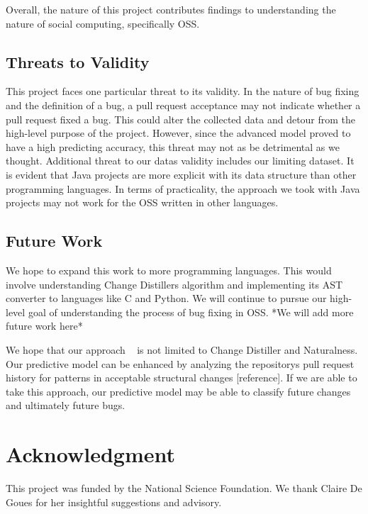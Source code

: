 \documentclass[10pt, conference]{IEEEtran}
\begin{document}
Overall, the nature of this project contributes findings to understanding the nature of social computing, specifically OSS. 

\subsection{Threats to Validity}
This project faces one particular threat to its validity. In the nature of bug fixing and the definition of a bug, a pull request acceptance may not indicate whether a pull request fixed a bug. This could alter the collected data and detour from the high-level purpose of the project. However, since the advanced model proved to have a high predicting accuracy, this threat may not as be detrimental as we thought. Additional threat to  our data\textquotesingle s validity includes our limiting dataset. It is evident that Java projects are more explicit with its data structure than other programming languages. In terms of practicality, the approach we took with Java projects may not work for the OSS written in other languages.

\subsection{Future Work}
We hope to expand this work to more programming languages. This would involve understanding Change Distiller\textquotesingle s algorithm and implementing its AST converter to languages like C and Python. We will continue to pursue our high-level goal of understanding the process of bug fixing in OSS. *We will add more future work here*

We hope that our approach ~\cite{Giachino:2014:CRD:2731750.2731754} is not limited to Change Distiller and Naturalness. Our predictive model can be enhanced by analyzing the repository\textquotesingle s pull request history for patterns in acceptable structural changes [reference]. If we are able to take this approach, our predictive model may be able to classify future changes and ultimately future bugs. ~\cite{Yu}

\section*{Acknowledgment}
This project was funded by the National Science Foundation. We thank Claire De Goues for her insightful suggestions and advisory.





\end{document}
